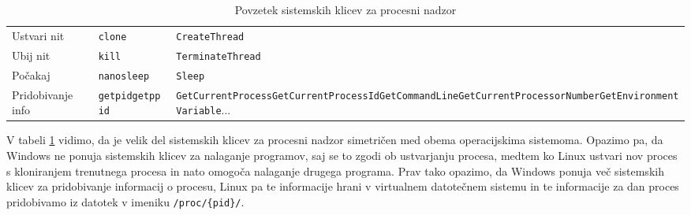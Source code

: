 \documentclass[a4paper,12pt,openright]{book}
\begin{document}
\begin{table}[h!]
\begin{center}
\begin{tabular}{ p{3.7cm}|p{2.5cm}|p{6cm} }
			Ustvari nit       & \verb|clone|                                           & \verb|CreateThread|                                                                                                                                                             \\
			Ubij nit          & \verb|kill|                                            & \verb|TerminateThread|                                                                                                                                                          \\
			Počakaj          & \verb|nanosleep|                                       & \verb|Sleep|                                                                                                                                                                    \\
			Pridobivanje info & \verb|getpid|\newline\verb|getppid|                    & \verb|GetCurrentProcess|\newline\verb|GetCurrentProcessId|\newline\verb|GetCommandLine|\newline\verb|GetCurrentProcessorNumber|\newline\verb|GetEnvironmentVariable|\newline... \\
		\end{tabular}
	\end{center}
	\caption{Povzetek sistemskih klicev za procesni nadzor}
	\label{tab:process_control}
\end{table}

V tabeli \ref{tab:process_control} vidimo, da je velik del sistemskih klicev za procesni nadzor simetričen med obema operacijskima sistemoma.
Opazimo pa, da Windows ne ponuja sistemskih klicev za nalaganje programov, saj se to zgodi ob ustvarjanju procesa, medtem ko Linux ustvari nov proces s kloniranjem trenutnega procesa in nato omogoča nalaganje drugega programa.
Prav tako opazimo, da Windows ponuja več sistemskih klicev za pridobivanje informacij o procesu, Linux pa te informacije hrani v virtualnem datotečnem sistemu in te informacije za dan proces pridobivamo iz datotek v imeniku \verb|/proc/{pid}/|.
\end{document}
